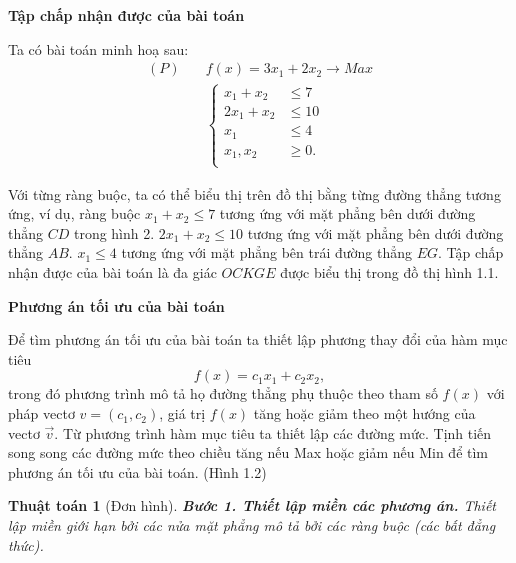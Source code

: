 \documentclass[12pt,a4paper]{report}
\newtheorem{ttoan}{Thuật toán}
\begin{document}
 \textbf{Tập chấp nhận được của bài toán}

Ta có bài toán minh hoạ sau:
\begin{equation}
	\begin{split}
	(P) \quad & f(x) = 3x_1 + 2x_2 \longrightarrow Max \\
		& \left\{\begin{split}
		x_1 + x_2 &\leq 7 \\
		2x_1 + x_2 &\leq 10 \\
		x_1 &\leq 4 \\
		x_1, x_2 &\geq 0. \\
		\end{split}\right.    
	\end{split}
\end{equation}

Với từng ràng buộc, ta có thể biểu thị trên đồ thị bằng từng đường thẳng tương ứng, ví dụ, ràng buộc
$x_1 + x_2 \leq 7$
tương ứng với mặt phẳng bên dưới đường thẳng $CD$ trong hình 2.
$2x_1 + x_2 \leq 10$
tương ứng với mặt phẳng bên dưới đường thẳng $AB$.
$x_1 \leq 4$
tương ứng với mặt phẳng bên trái đường thẳng $EG$. Tập chấp nhận được của bài toán là đa giác $OCKGE$ được biểu thị trong đồ thị hình 1.1.

 \textbf{Phương án tối ưu của bài toán}

 Để tìm phương án tối ưu của bài toán ta thiết lập phương thay đổi của hàm mục tiêu
\begin{equation*}
f(x)=c_1x_1+c_2x_2,
\end{equation*}
trong đó phương trình mô tả họ đường thẳng phụ thuộc theo tham số $f(x)$ với pháp vectơ $v=(c_1,c_2)$, giá trị $f(x)$ tăng hoặc giảm theo một hướng của vectơ $\vec{v}$.
 Từ phương trình hàm mục tiêu ta thiết lập các đường mức.
 Tịnh tiến song song các đường mức theo chiều tăng nếu Max hoặc giảm nếu Min để tìm phương án tối ưu của bài toán. (Hình 1.2)

\begin{ttoan}[Đơn hình]

\noindent \textbf{Bước 1. Thiết lập miền các phương án.}
Thiết lập miền giới hạn bởi các nửa mặt phẳng mô tả bởi các ràng buộc (các bất đẳng thức).

\end{ttoan}
\end{document}
